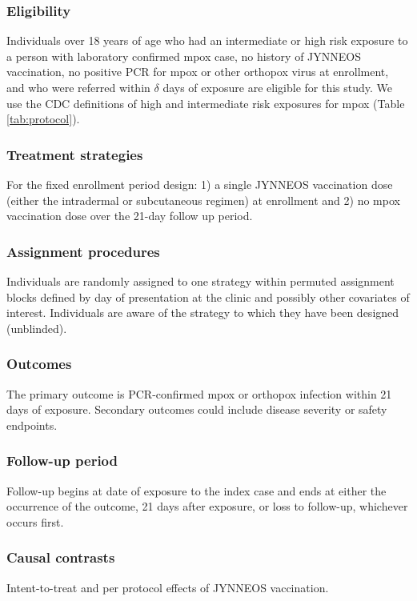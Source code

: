 \documentclass[11pt]{article}
\begin{document}
\subsubsection*{Eligibility}

Individuals over 18 years of age who had an intermediate or high risk exposure to a person with laboratory confirmed mpox case, no history of JYNNEOS vaccination, no positive PCR for mpox or other orthopox virus at enrollment, and who were referred within $\delta$ days of exposure are eligible for this study. We use the CDC definitions of high and intermediate risk exposures \cite{cdc_mpox_2022} for mpox (Table \ref{tab:protocol}).

\subsubsection*{Treatment strategies}
For the fixed enrollment period design: 1) a single JYNNEOS vaccination dose (either the intradermal or subcutaneous regimen) at enrollment and 2) no mpox vaccination dose over the 21-day follow up period. 

\subsubsection*{Assignment procedures}
Individuals are randomly assigned to one strategy within permuted assignment blocks defined by day of presentation at the clinic and possibly other covariates of interest. Individuals are aware of the strategy to which they have been designed (unblinded).
 
\subsubsection*{Outcomes}
The primary outcome is PCR-confirmed mpox or orthopox infection within 21 days of exposure. Secondary outcomes could include disease severity or safety endpoints. 

\subsubsection*{Follow-up period}
Follow-up begins at date of exposure to the index case and ends at either the occurrence of the outcome, 21 days after exposure, or loss to follow-up, whichever occurs first.

\subsubsection*{Causal contrasts}
Intent-to-treat and per protocol effects \cite{hernan_per-protocol_2017} of JYNNEOS vaccination.
\end{document}
